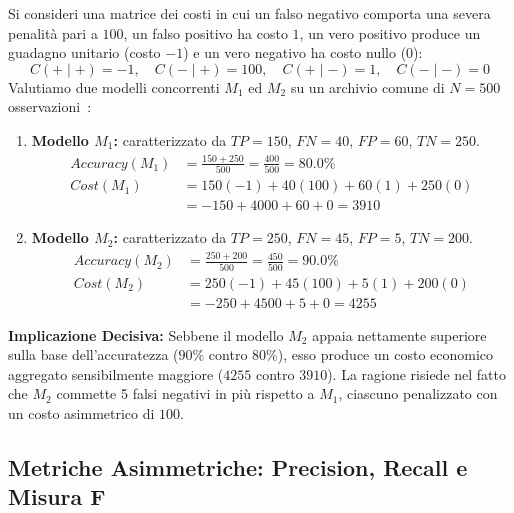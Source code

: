 \begin{example}
Si consideri una matrice dei costi in cui un falso negativo comporta una severa penalità pari a $100$, un falso positivo ha costo $1$, un vero positivo produce un guadagno unitario (costo $-1$) e un vero negativo ha costo nullo ($0$):
\begin{equation*}
    C(+ \mid +) = -1, \quad C(- \mid +) = 100, \quad C(+ \mid -) = 1, \quad C(- \mid -) = 0
\end{equation*}
Valutiamo due modelli concorrenti $M_1$ ed $M_2$ su un archivio comune di $N = 500$ osservazioni~\cite{tan2018}:
\begin{enumerate}
    \item \textbf{Modello $M_1$:} caratterizzato da $TP = 150$, $FN = 40$, $FP = 60$, $TN = 250$.
    \begin{align}
        Accuracy(M_1) &= \frac{150 + 250}{500} = \frac{400}{500} = 80.0\% \\
        Cost(M_1) &= 150(-1) + 40(100) + 60(1) + 250(0) \nonumber \\
                  &= -150 + 4000 + 60 + 0 = 3910
    \end{align}
    \item \textbf{Modello $M_2$:} caratterizzato da $TP = 250$, $FN = 45$, $FP = 5$, $TN = 200$.
    \begin{align}
        Accuracy(M_2) &= \frac{250 + 200}{500} = \frac{450}{500} = 90.0\% \\
        Cost(M_2) &= 250(-1) + 45(100) + 5(1) + 200(0) \nonumber \\
                  &= -250 + 4500 + 5 + 0 = 4255
    \end{align}
\end{enumerate}
\textbf{Implicazione Decisiva:} Sebbene il modello $M_2$ appaia nettamente superiore sulla base dell'accuratezza ($90\%$ contro $80\%$), esso produce un costo economico aggregato sensibilmente maggiore ($4255$ contro $3910$). La ragione risiede nel fatto che $M_2$ commette 5 falsi negativi in più rispetto a $M_1$, ciascuno penalizzato con un costo asimmetrico di $100$.
\end{example}

\FloatBarrier
\subsection{Metriche Asimmetriche: Precision, Recall e Misura F}
\label{subsec:dm-precision-recall-fmeasure}

